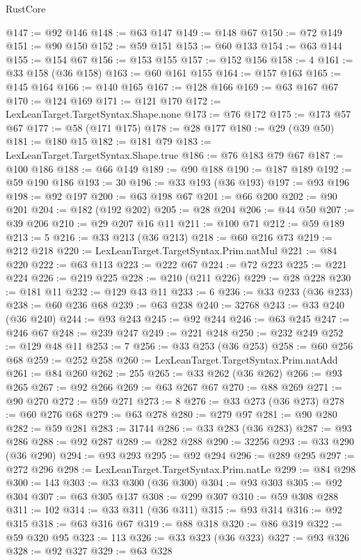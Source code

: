 \begin{lexlean}{RustCore}
\begin{coremodule}
@147 := @92 @146
@148 := @63 @147
@149 := @148 @67
@150 := @72 @149
@151 := @90 @150
@152 := @59 @151
@153 := @60 @133
@154 := @63 @144
@155 := @154 @67
@156 := @153 @155
@157 := @152 @156
@158 := 4
@161 := @33 @158 (@36 @158)
@163 := @60 @161 @155
@164 := @157 @163
@165 := @145 @164
@166 := @140 @165
@167 := @128 @166
@169 := @63 @167 @67
@170 := @124 @169
@171 := @121 @170
@172 := LexLeanTarget.TargetSyntax.Shape.none
@173 := @76 @172
@175 := @173 @57 @67
@177 := @58 (@171 @175)
@178 := @28 @177
@180 := @29 (@39 @50)
@181 := @180 @15
@182 := @181 @79
@183 := LexLeanTarget.TargetSyntax.Shape.true
@186 := @76 @183 @79 @67
@187 := @100 @186
@188 := @66 @149
@189 := @90 @188
@190 := @187 @189
@192 := @59 @190 @186
@193 := 30
@196 := @33 @193 (@36 @193)
@197 := @93 @196
@198 := @92 @197
@200 := @63 @198 @67
@201 := @66 @200
@202 := @90 @201
@204 := @182 (@192 @202)
@205 := @28 @204
@206 := @44 @50
@207 := @39 @206
@210 := @29 @207 @16 @11
@211 := @100 @71
@212 := @59 @189
@213 := 5
@216 := @33 @213 (@36 @213)
@218 := @60 @216 @73
@219 := @212 @218
@220 := LexLeanTarget.TargetSyntax.Prim.natMul
@221 := @84 @220
@222 := @63 @113
@223 := @222 @67
@224 := @72 @223
@225 := @221 @224
@226 := @219 @225
@228 := @210 (@211 @226)
@229 := @28 @228
@230 := @181 @11
@232 := @129 @43 @11
@233 := 6
@236 := @33 @233 (@36 @233)
@238 := @60 @236 @68
@239 := @63 @238
@240 := 32768
@243 := @33 @240 (@36 @240)
@244 := @93 @243
@245 := @92 @244
@246 := @63 @245
@247 := @246 @67
@248 := @239 @247
@249 := @221 @248
@250 := @232 @249
@252 := @129 @48 @11
@253 := 7
@256 := @33 @253 (@36 @253)
@258 := @60 @256 @68
@259 := @252 @258
@260 := LexLeanTarget.TargetSyntax.Prim.natAdd
@261 := @84 @260
@262 := 255
@265 := @33 @262 (@36 @262)
@266 := @93 @265
@267 := @92 @266
@269 := @63 @267 @67
@270 := @88 @269
@271 := @90 @270
@272 := @59 @271
@273 := 8
@276 := @33 @273 (@36 @273)
@278 := @60 @276 @68
@279 := @63 @278
@280 := @279 @97
@281 := @90 @280
@282 := @59 @281
@283 := 31744
@286 := @33 @283 (@36 @283)
@287 := @93 @286
@288 := @92 @287
@289 := @282 @288
@290 := 32256
@293 := @33 @290 (@36 @290)
@294 := @93 @293
@295 := @92 @294
@296 := @289 @295
@297 := @272 @296
@298 := LexLeanTarget.TargetSyntax.Prim.natLe
@299 := @84 @298
@300 := 143
@303 := @33 @300 (@36 @300)
@304 := @93 @303
@305 := @92 @304
@307 := @63 @305 @137
@308 := @299 @307
@310 := @59 @308 @288
@311 := 102
@314 := @33 @311 (@36 @311)
@315 := @93 @314
@316 := @92 @315
@318 := @63 @316 @67
@319 := @88 @318
@320 := @86 @319
@322 := @59 @320 @95
@323 := 113
@326 := @33 @323 (@36 @323)
@327 := @93 @326
@328 := @92 @327
@329 := @63 @328

\end{coremodule}
\end{lexlean}
